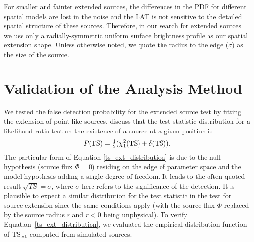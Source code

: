 \documentclass[12pt,preprint]{aastex}
\newcommand{\tsext}{{\ensuremath{\text{TS}_{\text{ext}}}}\xspace}
\newcommand{\ts}{\text{TS}\xspace}
\begin{document}
For smaller and fainter extended sources, the differences in the PDF for
different spatial models are lost in the noise and the LAT is not sensitive
to the detailed spatial structure of these sources.  Therefore, in our
search for extended sources we use only a radially-symmetric uniform
surface brightness profile as our spatial extension shape. Unless otherwise noted,
we quote the radius to the edge ($\sigma$) as the size of the source.

\section{Validation of the Analysis Method}

\label{monte_carlo_validation}

We tested the false detection probability for the extended source test
by fitting the extension of point-like sources.  \cite{mattox_egret}
discuss that the test statistic distribution for a likelihood ratio test
on the existence of a source at a given position is
\begin{equation}\label{ts_ext_distribution}
  P(\ts)=\onehalf(\chi^2_1(\ts)+\delta(\ts)).
\end{equation}
The particular form of Equation \ref{ts_ext_distribution} is due to the
null hypothesis (source flux $\Phi=0$) residing on the edge of parameter
space and the model hypothesis adding a single degree of freedom.
It leads to the often quoted result $\sqrt{TS}=\sigma$, where 
$\sigma$ here refers to the significance of the detection. It is plausible
to expect a similar distribution for the test statistic in the test for
source extension since the same conditions apply (with the source flux
$\Phi$ replaced by the source radius $r$ and $r<0$ being unphysical).
To verify Equation~\ref{ts_ext_distribution}, we evaluated the
empirical distribution function of \tsext computed from simulated sources.
\end{document}
